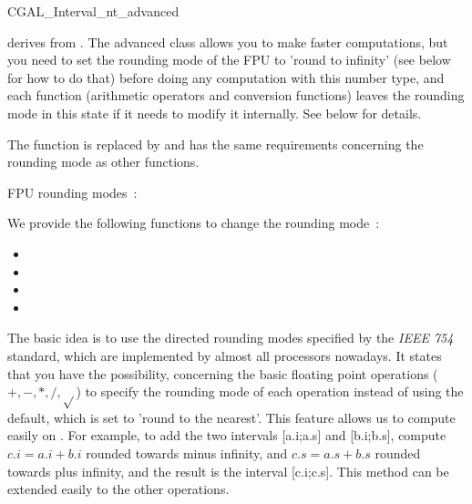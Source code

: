 \begin{ccAdvanced}

\begin{ccClass} {CGAL_Interval_nt_advanced}
\label{interval-adv}

 derives from .
The advanced class allows you to make faster computations, but you need to set
the rounding mode of the FPU to 'round to infinity' (see below for how to do
that) before doing any computation with this number type, and each function
(arithmetic operators and conversion functions)
leaves the rounding mode in this state if it needs to modify it internally.
See below for details.


The function  is replaced by
 and has the same
requirements concerning the rounding mode as other functions.


FPU rounding modes~:

We provide the following functions to change the rounding mode~:
\begin{itemize}
\item {}
\item {}
\item {}
\item {}
\end{itemize}

\ccImplementation

The basic idea is to use the directed rounding modes specified by the 
{\it IEEE 754} standard, which are implemented by almost all processors 
nowadays.
It states that you have the possibility, concerning the basic floating point
operations ($+,-,*,/,\sqrt{}$) to specify the rounding mode of each operation
instead of using the default, which is set to 'round to the nearest'.
This feature allows us to compute easily on .  For example, to
add the two intervals [a.i;a.s] and [b.i;b.s], compute $c.i=a.i+b.i$ rounded
towards minus infinity, and $c.s=a.s+b.s$ rounded towards plus infinity, and
the result is the interval [c.i;c.s].  This method can be extended easily to
the other operations.


\end{ccClass}
\end{ccAdvanced}
